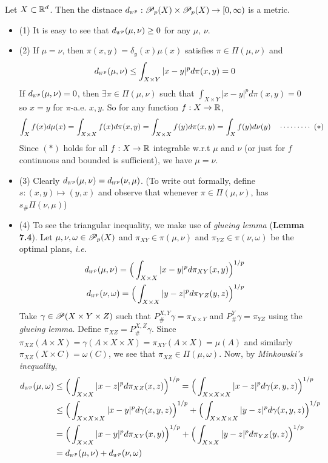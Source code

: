\documentclass[12pt,a4paper]{article}
\newenvironment{proof}
{\begin{changemargin}{1cm}{0.5cm} 
	}%
	{\end{changemargin}
}
\renewenvironment{i}
{\begin{itemize} 
	}%
	{\end{itemize}
}
\newenvironment{p}
{\begin{proof} 
	}%
	{\end{proof}
}
\begin{document}
 Let $X\subset \mathbb{R}^d$. Then the distnace $\wa{p} : \PP_p(X) \times \PP_p(X) \rightarrow [0, \infty)$ is a metric.
\begin{p}
\pf \begin{i}
\item[(1)] It is easy to see that $\wa{p}(\mu, \nu) \geq 0$ for any $\mu$, $\nu$.

\item[(2)] If $\mu = \nu$, then $\pi(x,y) = \delta_y(x) \mu(x)$ satisfies $\pi \in \Pi(\mu, \nu)$ and
\begin{align*}
\wa{p}(\mu, \nu) \leq \int_{X\times Y} |x-y|^p d\pi(x,y) = 0
\end{align*}
If $\wa{p}(\mu, \nu) =0$, then $\exists \pi \in \Pi(\mu, \nu)$ such that $\int_{X\times Y} |x-y|^p d\pi(x,y) =0$ so $x=y$ for $\pi$-a.e. $x,y$. So for any function $f:X\rightarrow \mathbb{R}$,
\begin{align*}
\int_X f(x) d\mu(x) = \int_{X\times X} f(x) d\pi(x,y) = \int_{X\times X} f(y) d\pi(x,y)  = \int_X f(y)d\nu(y) \quad \cdots\cdots\cdots\,\,(*)
\end{align*}
Since $(*)$ holds for all $f:X\rightarrow \mathbb{R}$ integrable w.r.t $\mu$ and $\nu$ (or just for $f$ continuous and bounded is sufficient), we have $\mu = \nu$.
\item[(3)] Clearly $\wa{p}(\mu, \nu)= \wa{p}(\nu,\mu)$. (To write out formally, define $s:(x,y) \mapsto (y,x)$ and observe that whenever $\pi \in \Pi(\mu, \nu)$, has $s_{\#} \Pi(\nu, \mu)$)
\item[(4)] To see the triangular inequality, we make use of \emph{glueing lemma} (\textbf{Lemma 7.4}). Let $\mu, \nu, \omega \in \mathscr{P}_p(X)$ and $\pi_{XY} \in \pi(\mu, \nu)$ and $\pi_{YZ} \in \pi(\nu, \omega)$ be the optimal plans, \textit{i.e.}
\begin{align*}
\wa{p}(\mu, \nu) = \Big( \int_{X\times X} |x-y|^p d\pi_{XY}(x,y) \Big)^{1/p} \\
\wa{p}(\nu, \omega) = \Big( \int_{X\times X} |y-z|^p d\pi_{YZ}(y,z) \Big)^{1/p}
\end{align*}
Take $\gamma \in \mathscr{P}(X\times Y\times Z)$ such that $P^{X,Y}_{\#} \gamma =\pi_{X\times Y}$ and $P^Y_{\#} \gamma =\pi_{YZ}$ using the \emph{glueing lemma}. Define $\pi_{XZ} = P^{X, Z}_{\#} \gamma$. Since $\pi_{XZ}(A\times X) = \gamma(A\times X \times X) = \pi_{XY}(A\times X) = \mu(A)$ and similarly $\pi_{XZ} (X\times C) = \omega(C)$, we see that $\pi_{XZ} \in \Pi(\mu, \omega)$. Now, by \emph{Minkowski's inequality},
\begin{align*}
\wa{p}(\mu, \omega) &\leq \Big( \int_{X\times X} |x-z|^p d\pi_{XZ}(x,z) \Big)^{1/p} = \Big( \int_{X\times X\times X} |x-z|^p d\gamma (x,y,z) \Big)^{1/p} \\
&\leq \Big( \int_{X\times X\times X} |x-y|^p d\gamma (x,y,z) \Big)^{1/p} + \Big( \int_{X\times X\times X} |y-z|^p d\gamma (x,y,z) \Big)^{1/p} \\
&= \Big( \int_{ X\times X} |x-y|^p d\pi_{XY} (x,y) \Big)^{1/p} + \Big( \int_{X\times X} |y-z|^p d\pi_{YZ} (y,z) \Big)^{1/p} \\
&=\wa{p}(\mu, \nu) + \wa{p}(\nu, \omega)
\end{align*}
\end{i}
\eop
\end{p}
\s
\end{document}
